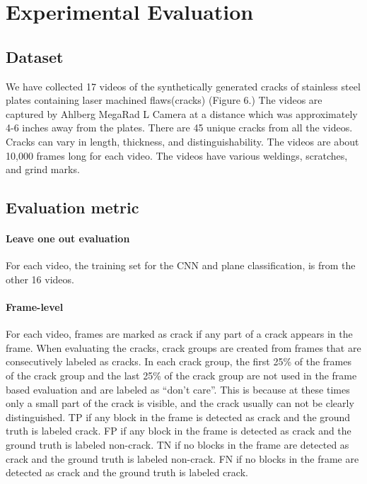 \section{Experimental Evaluation}
    \subsection{Dataset}
        We have collected 17 videos of the synthetically generated cracks of stainless steel plates containing laser machined flaws(cracks) (Figure 6.) The videos are captured by Ahlberg MegaRad L Camera at a distance which was approximately 4-6 inches away from the plates. There are 45 unique cracks from all the videos. Cracks can vary in length, thickness, and distinguishability. The videos are about 10,000 frames long for each video. The videos have various weldings, scratches, and grind marks.

    \subsection{Evaluation metric}
        \paragraph{Leave one out evaluation}
            For each video, the training set for the CNN and plane classification, is from the other 16 videos.
    
        \paragraph{Frame-level}
            For each video, frames are marked as crack if any part of a crack appears in the frame. When evaluating the cracks,  crack groups are created from frames that are consecutively labeled as cracks.  In each crack group, the first 25\% of the frames of the crack group and the last 25\% of the crack group are not used in the frame based evaluation and are labeled as “don’t care”. This is because at these times only a small part of the crack is visible, and the crack usually can not be clearly distinguished.
                TP if any block in the frame is detected as crack and the ground truth is labeled crack.
                FP if any block in the frame is detected as crack and the ground truth is labeled non-crack.
                TN if no blocks in the frame are detected as crack and the ground truth is labeled non-crack.
                FN if no blocks in the frame are detected as crack and the ground truth is labeled crack.
    
